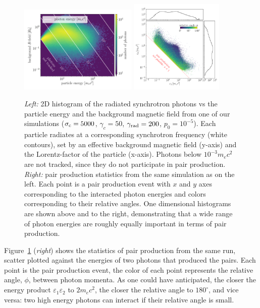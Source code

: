 \begin{figure}[tb]
    \centering
    \includegraphics[width=0.5\textwidth]{figures/ch4-pairproduction/fig_b1.pdf}
    \includegraphics[width=0.4\textwidth]{figures/ch4-pairproduction/fig_b2.pdf}
    \caption{{\it Left:} 2D histogram of the radiated synchrotron photons vs the particle energy and the background magnetic field from one of our simulations ($\sigma_{\rm c}=5000$, $\gamma_c=50$, $\gamma_{\rm rad}=200$, $p_0=10^{-5}$). Each particle radiates at a corresponding synchrotron frequency (white contours), set by an effective background magnetic field (y-axis) and the Lorentz-factor of the particle (x-axis). Photons below $10^{-3}m_e c^2$ are not tracked, since they do not participate in pair production. {\it Right:} pair production statistics from the same simulation as on the left. Each point is a pair production event with $x$ and $y$ axes corresponding to the interacted photon energies and colors corresponding to their relative angles. One dimensional histograms are shown above and to the right, demonstrating that a wide range of photon energies are roughly equally important in terms of pair production.}
    \label{fig:pairprod-phot_born}
\end{figure}

Figure~\ref{fig:pairprod-phot_born} ({\it right}) shows the statistics of pair production from the same run, scatter plotted against the energies of two photons that produced the pairs. Each point is the pair production event, the color of each point represents the relative angle, $\phi$, between photon momenta. As one could have anticipated, the closer the energy product $\varepsilon_1\varepsilon_2$ to $2m_e c^2$, the closer the relative angle to $180^{\circ}$, and vice versa: two high energy photons can interact if their relative angle is small.

